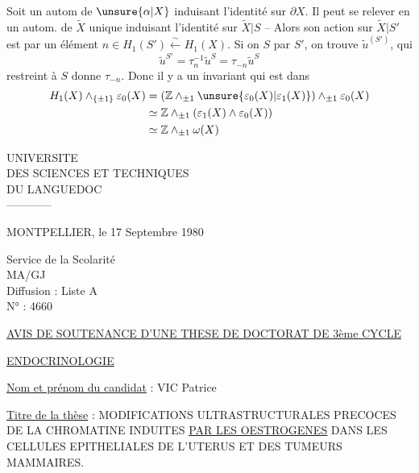 Soit un autom  de $\unsure{\alpha|X}$ induisant l'identité sur $\partial X$. Il peut se relever en un autom. de $\widetilde X$ unique  induisant l'identité sur $\widetilde X|S$ -- Alors son action sur $\widetilde X|S'$ est   par un élément  $n\in H_1(S')\xleftarrow{\sim}H_1(X)$. Si on   $S$ par $S'$, on trouve $\widetilde u^{(S')}$, qui
\[
\widetilde u^{S'}=\tau_n^{-1}\widetilde u^S=\tau_{-n}\widetilde u^S
\]
  restreint à $S$ donne $\tau_{-n}$. Donc il y a un invariant qui est dans
\[
\begin{aligned}
H_1(X)\wedge_{\{\pm1\}}\varepsilon_0(X)
&=(\mathbb Z\wedge_{\pm1}\unsure{\varepsilon_0(X)|\varepsilon_1(X)})\wedge_{\pm1}\varepsilon_0(X)\\
&\simeq\mathbb Z\wedge_{\pm1}(\varepsilon_1(X)\wedge\varepsilon_0(X))\\
&\simeq\mathbb Z\wedge_{\pm1}\omega(X)
\end{aligned}
\]


UNIVERSITE\\
DES SCIENCES ET TECHNIQUES\\
DU LANGUEDOC\\
------------

MONTPELLIER, le 17 Septembre 1980

Service de la Scolarité\\
MA/GJ\\
Diffusion : Liste A\\
N° : 4660

\uline{AVIS DE SOUTENANCE D'UNE THESE DE DOCTORAT DE 3ème CYCLE}

\uline{ENDOCRINOLOGIE}

\uline{Nom et prénom du candidat} : VIC Patrice

\uline{Titre de la thèse} : MODIFICATIONS ULTRASTRUCTURALES PRECOCES DE LA CHROMATINE INDUITES \uline{PAR LES OESTROGENES} DANS LES CELLULES EPITHELIALES DE L'UTERUS ET DES TUMEURS MAMMAIRES.


